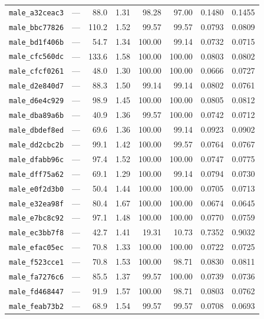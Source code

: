 \begin{longtable}{lrrrrrrr}
\texttt{male\_a32ceac3} & --- & 88.0 & 1.31 & 98.28 & 97.00 & 0.1480 & 0.1455 \\
\texttt{male\_bbc77826} & --- & 110.2 & 1.52 & 99.57 & 99.57 & 0.0793 & 0.0809 \\
\texttt{male\_bd1f406b} & --- & 54.7 & 1.34 & 100.00 & 99.14 & 0.0732 & 0.0715 \\
\texttt{male\_cfc560dc} & --- & 133.6 & 1.58 & 100.00 & 100.00 & 0.0803 & 0.0802 \\
\texttt{male\_cfcf0261} & --- & 48.0 & 1.30 & 100.00 & 100.00 & 0.0666 & 0.0727 \\
\texttt{male\_d2e840d7} & --- & 88.3 & 1.50 & 99.14 & 99.14 & 0.0802 & 0.0761 \\
\texttt{male\_d6e4c929} & --- & 98.9 & 1.45 & 100.00 & 100.00 & 0.0805 & 0.0812 \\
\texttt{male\_dba89a6b} & --- & 40.9 & 1.36 & 99.57 & 100.00 & 0.0742 & 0.0712 \\
\texttt{male\_dbdef8ed} & --- & 69.6 & 1.36 & 100.00 & 99.14 & 0.0923 & 0.0902 \\
\texttt{male\_dd2cbc2b} & --- & 99.1 & 1.42 & 100.00 & 99.57 & 0.0764 & 0.0767 \\
\texttt{male\_dfabb96c} & --- & 97.4 & 1.52 & 100.00 & 100.00 & 0.0747 & 0.0775 \\
\texttt{male\_dff75a62} & --- & 69.1 & 1.29 & 100.00 & 99.14 & 0.0794 & 0.0730 \\
\texttt{male\_e0f2d3b0} & --- & 50.4 & 1.44 & 100.00 & 100.00 & 0.0705 & 0.0713 \\
\texttt{male\_e32ea98f} & --- & 80.4 & 1.67 & 100.00 & 100.00 & 0.0674 & 0.0645 \\
\texttt{male\_e7bc8c92} & --- & 97.1 & 1.48 & 100.00 & 100.00 & 0.0770 & 0.0759 \\
\texttt{male\_ec3bb7f8} & --- & 42.7 & 1.41 & 19.31 & 10.73 & 0.7352 & 0.9032 \\
\texttt{male\_efac05ec} & --- & 70.8 & 1.33 & 100.00 & 100.00 & 0.0722 & 0.0725 \\
\texttt{male\_f523cce1} & --- & 70.8 & 1.53 & 100.00 & 98.71 & 0.0830 & 0.0811 \\
\texttt{male\_fa7276c6} & --- & 85.5 & 1.37 & 99.57 & 100.00 & 0.0739 & 0.0736 \\
\texttt{male\_fd468447} & --- & 91.9 & 1.57 & 100.00 & 98.71 & 0.0803 & 0.0762 \\
\texttt{male\_feab73b2} & --- & 68.9 & 1.54 & 99.57 & 99.57 & 0.0708 & 0.0693 \\
\end{longtable}\endgroup
